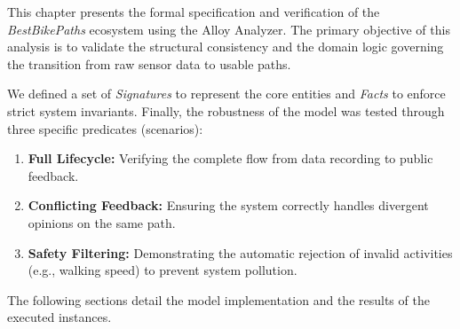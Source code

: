 
This chapter presents the formal specification and verification of the \textit{BestBikePaths} ecosystem using the Alloy Analyzer. 
The primary objective of this analysis is to validate the structural consistency and the domain logic governing the transition from raw sensor data to usable paths.

We defined a set of \textit{Signatures} to represent the core entities and \textit{Facts} to enforce strict system invariants. Finally, the robustness of the model was tested through three specific predicates (scenarios):
\begin{enumerate}
    \item \textbf{Full Lifecycle:} Verifying the complete flow from data recording to public feedback.
    \item \textbf{Conflicting Feedback:} Ensuring the system correctly handles divergent opinions on the same path.
    \item \textbf{Safety Filtering:} Demonstrating the automatic rejection of invalid activities (e.g., walking speed) to prevent system pollution.
\end{enumerate}

The following sections detail the model implementation and the results of the executed instances.

